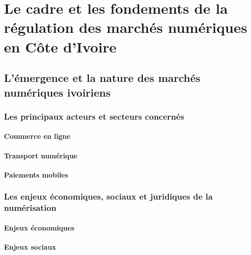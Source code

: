 
\part{Le cadre et les fondements de la régulation des marchés numériques en Côte d'Ivoire}

\newpage
\chapter{L'émergence et la nature des marchés numériques ivoiriens}

\section{Les principaux acteurs et secteurs concernés}

\subsection{Commerce en ligne}


\subsection{Transport numérique}


\subsection{Paiements mobiles}


\section{Les enjeux économiques, sociaux et juridiques de la numérisation}

\subsection{Enjeux économiques}


\subsection{Enjeux sociaux}

